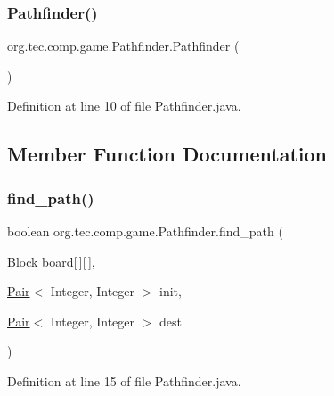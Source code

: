 \subsubsection{\texorpdfstring{Pathfinder()}{Pathfinder()}}
{\footnotesize\ttfamily org.\+tec.\+comp.\+game.\+Pathfinder.\+Pathfinder (\begin{DoxyParamCaption}{ }\end{DoxyParamCaption})\hspace{0.3cm}{\ttfamily [inline]}}



Definition at line 10 of file Pathfinder.\+java.



\subsection{Member Function Documentation}
\mbox{\label{classorg_1_1tec_1_1comp_1_1game_1_1_pathfinder_a617b30f7fe395815d26315171a5be003}} 
\subsubsection{\texorpdfstring{find\+\_\+path()}{find\_path()}}
{\footnotesize\ttfamily boolean org.\+tec.\+comp.\+game.\+Pathfinder.\+find\+\_\+path (\begin{DoxyParamCaption}\item[{\mbox{\hyperlink{classorg_1_1tec_1_1comp_1_1game_1_1_block}{Block}}}]{board\mbox{[}$\,$\mbox{]}\mbox{[}$\,$\mbox{]},  }\item[{\mbox{\hyperlink{classorg_1_1tec_1_1comp_1_1interpreter_1_1_pair}{Pair}}$<$ Integer, Integer $>$}]{init,  }\item[{\mbox{\hyperlink{classorg_1_1tec_1_1comp_1_1interpreter_1_1_pair}{Pair}}$<$ Integer, Integer $>$}]{dest }\end{DoxyParamCaption})\hspace{0.3cm}{\ttfamily [inline]}}



Definition at line 15 of file Pathfinder.\+java.

\mbox{\label{classorg_1_1tec_1_1comp_1_1game_1_1_pathfinder_a50a7f6d655a754a8a7e4e37726b5c1c9}} 
